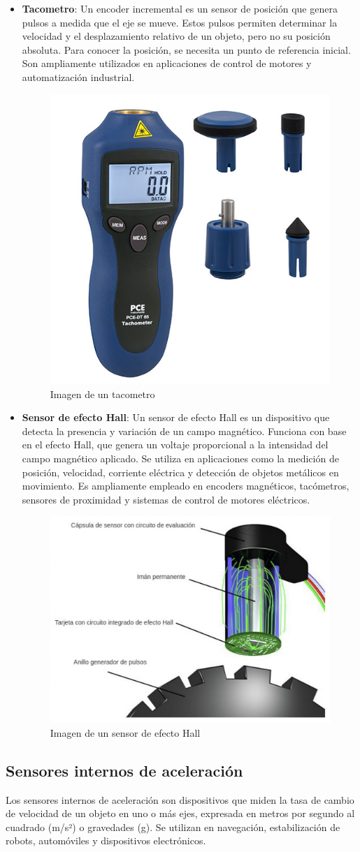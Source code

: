 \begin{itemize}
	\item \textbf{Tacometro}: Un encoder incremental es un sensor de posición que genera pulsos a medida que el eje se mueve. Estos pulsos permiten determinar la velocidad y el desplazamiento relativo de un objeto, pero no su posición absoluta. Para conocer la posición, se necesita un punto de referencia inicial. Son ampliamente utilizados en aplicaciones de control de motores y automatización industrial.
	\begin{figure}[h]
		\centering
		\includegraphics[width=4 cm]{img/Taco}
		\caption{Imagen de un tacometro}
		\label{fig:Taco}
	\end{figure}
	\item \textbf{Sensor de efecto Hall}: Un sensor de efecto Hall es un dispositivo que detecta la presencia y variación de un campo magnético. Funciona con base en el efecto Hall, que genera un voltaje proporcional a la intensidad del campo magnético aplicado. Se utiliza en aplicaciones como la medición de posición, velocidad, corriente eléctrica y detección de objetos metálicos en movimiento. Es ampliamente empleado en encoders magnéticos, tacómetros, sensores de proximidad y sistemas de control de motores eléctricos.
	\begin{figure}[h]
		\centering
		\includegraphics[width=8 cm]{img/Hall}
		\caption{Imagen de un sensor de efecto Hall}
		\label{fig:Hall}
	\end{figure}
\end{itemize}\newpage
\subsection{Sensores internos de aceleración}
Los sensores internos de aceleración son dispositivos que miden la tasa de cambio de velocidad de un objeto en uno o más ejes, expresada en metros por segundo al cuadrado (m/s²) o gravedades (g). Se utilizan en navegación, estabilización de robots, automóviles y dispositivos electrónicos.

